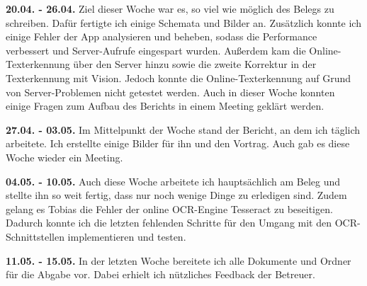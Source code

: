 \documentclass[notables, nomenclature, oneside, 150]{HSMW-Thesis}
\begin{document}
	\textbf{20.04. - 26.04.}
	Ziel dieser Woche war es, so viel wie möglich des Belegs zu schreiben. Dafür fertigte ich einige Schemata und Bilder an. Zusätzlich konnte ich einige Fehler der App analysieren und beheben, sodass die Performance verbessert und Server-Aufrufe eingespart wurden. Außerdem kam die Online-Texterkennung über den Server hinzu sowie die zweite Korrektur in der Texterkennung mit Vision. Jedoch konnte die Online-Texterkennung auf Grund von Server-Problemen nicht getestet werden. Auch in dieser Woche konnten einige Fragen zum Aufbau des Berichts in einem Meeting geklärt werden. 
	
	\textbf{27.04. - 03.05.}
	Im Mittelpunkt der Woche stand der Bericht, an dem ich täglich arbeitete. Ich erstellte einige Bilder für ihn und den Vortrag. Auch gab es diese Woche wieder ein Meeting.
	
	\textbf{04.05. - 10.05.}
	Auch diese Woche arbeitete ich hauptsächlich am Beleg und stellte ihn so weit fertig, dass nur noch wenige Dinge zu erledigen sind. Zudem gelang es Tobias die Fehler der online OCR-Engine Tesseract zu beseitigen. Dadurch konnte ich die letzten fehlenden Schritte für den Umgang mit den OCR-Schnittstellen implementieren und testen.
	
	\textbf{11.05. - 15.05.}
	In der letzten Woche bereitete ich alle Dokumente und Ordner für die Abgabe vor. Dabei erhielt ich nützliches Feedback der Betreuer. 
\end{document}
